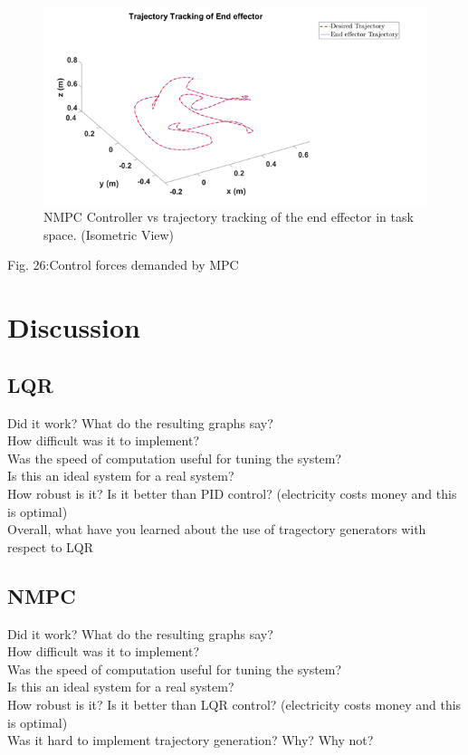 \documentclass{UoNMCHA}
\numberwithin{equation}{section}
\begin{document}
	\begin{figure}[H]
		\begin{center}
			\includegraphics[width=1\linewidth]{figs/Picture393}
			\caption{NMPC Controller vs trajectory tracking of the end effector in task space. (Isometric View)}
			\label{figs/Picture383}
		\end{center}
	\end{figure}
	Fig. 26:Control forces demanded by MPC
	
	
	\newpage
	\section{Discussion}
	
	\subsection{LQR}
	
	Did it work? What do the resulting graphs say?\\
	How difficult was it to implement?\\
	Was the speed of computation useful for tuning the system?\\
	Is this an ideal system for a real system?\\
	How robust is it? Is it better than PID control? (electricity costs money and this is optimal)\\
	Overall, what have you learned about the use of tragectory generators with respect to LQR\\
	
	\subsection{NMPC}
	
	Did it work? What do the resulting graphs say?\\
	How difficult was it to implement?\\
	Was the speed of computation useful for tuning the system? \\
	Is this an ideal system for a real system?\\
	How robust is it? Is it better than LQR control? (electricity costs money and this is optimal)\\
	Was it hard to implement trajectory generation? Why? Why not?\\
	
\end{document}
